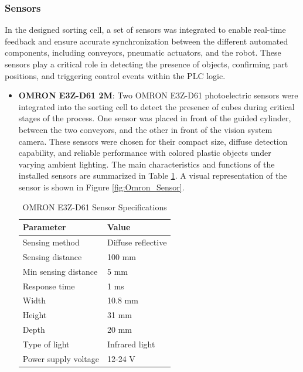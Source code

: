 \subsubsection{Sensors}
In the designed sorting cell, a set of sensors was integrated to enable real-time feedback and ensure accurate synchronization between the different automated components, including conveyors, pneumatic actuators, and the robot. These sensors play a critical role in detecting the presence of objects, confirming part positions, and triggering control events within the PLC logic.

\begin{itemize}
    \item \textbf{OMRON E3Z-D61 2M}:
    Two OMRON E3Z-D61 photoelectric sensors were integrated into the sorting cell to detect the presence of cubes during critical stages of the process. One sensor was placed in front of the guided cylinder, between the two conveyors, and the other in front of the vision system camera. These sensors were chosen for their compact size, diffuse detection capability, and reliable performance with colored plastic objects under varying ambient lighting.
    The main characteristics and functions of the installed sensors are summarized in Table \ref{tab:omron_specs}. A visual representation of the sensor is shown in Figure \ref{fig:Omron_Sensor}.
    \renewcommand{\arraystretch}{1.3}
    \setlength{\tabcolsep}{10pt}
    
    \begin{table}[H]
        \centering
        \caption{OMRON E3Z-D61 Sensor Specifications}
        \label{tab:omron_specs}
        \begin{tabularx}{\textwidth}{|l|X|}
            \hline
            \textbf{Parameter} & \textbf{Value} \\
            \hline
            Sensing method & Diffuse reflective \\
            \hline
            Sensing distance & 100 mm \\
            \hline
            Min sensing distance & 5 mm \\
            \hline
            Response time & 1 ms \\
            \hline
            Width & 10.8 mm \\
            \hline
            Height & 31 mm \\
            \hline
            Depth & 20 mm \\
            \hline
            Type of light & Infrared light \\
            \hline
            Power supply voltage & 12-24 V \\
            \hline
        \end{tabularx}
    \end{table}


\end{itemize}

